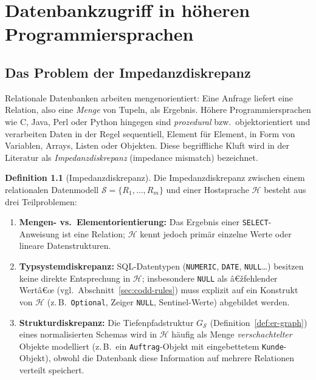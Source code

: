 ﻿\documentclass[a4paper,12pt]{report}
\theoremstyle{definition}
\newtheorem{definition}{Definition}[chapter]
\theoremstyle{remark}
\begin{document}
\chapter{Datenbankzugriff in höheren Programmiersprachen}
\label{ch:hostsprachen}

\section{Das Problem der Impedanzdiskrepanz}
\label{sec:impedanz}

Relationale Datenbanken arbeiten mengenorientiert: Eine Anfrage liefert
eine Relation, also eine \emph{Menge} von Tupeln, als Ergebnis. Höhere
Programmiersprachen wie C, Java, Perl oder Python hingegen sind
\emph{prozedural} bzw.\ objektorientiert und verarbeiten Daten in der
Regel sequentiell, Element für Element, in Form von Variablen, Arrays,
Listen oder Objekten. Diese begriffliche Kluft wird in der Literatur
als \emph{Impedanzdiskrepanz} (impedance mismatch) bezeichnet.

\begin{definition}[Impedanzdiskrepanz]
\label{def:impedanz}
Die Impedanzdiskrepanz zwischen einem relationalen Datenmodell
$\mathcal{S}=\{R_1,\ldots,R_m\}$ und einer Hostsprache $\mathcal{H}$
besteht aus drei Teilproblemen:
\begin{enumerate}
  \item \textbf{Mengen- vs.\ Elementorientierung:} Das Ergebnis einer
    \texttt{SELECT}-Anweisung ist eine Relation; $\mathcal{H}$ kennt
    jedoch primär einzelne Werte oder lineare Datenstrukturen.
  \item \textbf{Typsystemdiskrepanz:} SQL-Datentypen
    (\texttt{NUMERIC}, \texttt{DATE}, \texttt{NULL}\ldots) besitzen
    keine direkte Entsprechung in $\mathcal{H}$; insbesondere
    \texttt{NULL} als â€žfehlender Wertâ€œ (vgl.\
    Abschnitt~\ref{sec:codd-rules}) muss explizit auf ein Konstrukt von
    $\mathcal{H}$ (z.\,B.\ \texttt{Optional}, Zeiger \texttt{NULL},
    Sentinel-Werte) abgebildet werden.
  \item \textbf{Strukturdiskrepanz:} Die Tiefenpfadstruktur
    $G_{\mathcal{S}}$ (Definition~\ref{def:er-graph}) eines
    normalisierten Schemas wird in $\mathcal{H}$ häufig als Menge
    \emph{verschachtelter} Objekte modelliert (z.\,B.\ ein
    \texttt{Auftrag}-Objekt mit eingebettetem \texttt{Kunde}-Objekt),
    obwohl die Datenbank diese Information auf mehrere Relationen
    verteilt speichert.
\end{enumerate}
\end{definition}
\end{document}
